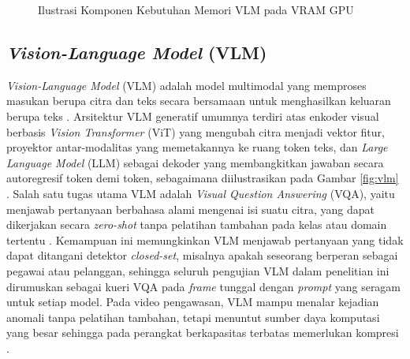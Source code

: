 \begin{figure}[htbp]
    \centering
    \caption{Ilustrasi Komponen Kebutuhan Memori VLM pada VRAM GPU}
    \label{fig:vram}
\end{figure}

\subsection{\textit{Vision-Language Model} (VLM)}
\textit{Vision-Language Model} (VLM) adalah model multimodal yang memproses masukan berupa citra dan teks secara bersamaan untuk menghasilkan keluaran berupa teks \cite{ref6}. Arsitektur VLM generatif umumnya terdiri atas enkoder visual berbasis \textit{Vision Transformer} (ViT) yang mengubah citra menjadi vektor fitur, proyektor antar-modalitas yang memetakannya ke ruang token teks, dan \textit{Large Language Model} (LLM) sebagai dekoder yang membangkitkan jawaban secara autoregresif token demi token, sebagaimana diilustrasikan pada Gambar \ref{fig:vlm} \cite{ref6}. Salah satu tugas utama VLM adalah \textit{Visual Question Answering} (VQA), yaitu menjawab pertanyaan berbahasa alami mengenai isi suatu citra, yang dapat dikerjakan secara \textit{zero-shot} tanpa pelatihan tambahan pada kelas atau domain tertentu \cite{ref6}. Kemampuan ini memungkinkan VLM menjawab pertanyaan yang tidak dapat ditangani detektor \textit{closed-set}, misalnya apakah seseorang berperan sebagai pegawai atau pelanggan, sehingga seluruh pengujian VLM dalam penelitian ini dirumuskan sebagai kueri VQA pada \textit{frame} tunggal \cite{ref22} dengan \textit{prompt} yang seragam untuk setiap model. Pada video pengawasan, VLM mampu menalar kejadian anomali tanpa pelatihan tambahan, tetapi menuntut sumber daya komputasi yang besar sehingga pada perangkat berkapasitas terbatas memerlukan kompresi \cite{ref14, ref22}.


